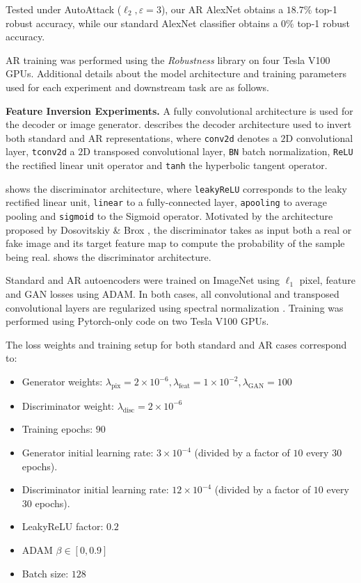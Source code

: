     Tested under AutoAttack ($\ell_{2}, \varepsilon=3$), our AR AlexNet obtains a $18.7\%$ top-1 robust accuracy, while our standard AlexNet classifier obtains a $0\%$ top-1 robust accuracy.
    
    AR training was performed using the \textit{Robustness} library \cite{robustness} on four Tesla V100 GPUs. Additional details about the model architecture and training parameters used for each experiment and downstream task are as follows.
    
    \textbf{Feature Inversion Experiments.} A fully convolutional architecture is used for the decoder or image generator.  describes the decoder architecture used to invert both standard and AR representations, where \texttt{conv2d} denotes a $2$D convolutional layer, \texttt{tconv2d} a $2$D transposed convolutional layer, \texttt{BN} batch normalization, \texttt{ReLU} the rectified linear unit operator and \texttt{tanh} the hyperbolic tangent operator.
    
    
    
     shows the discriminator architecture, where \texttt{leakyReLU} corresponds to the leaky rectified linear unit, \texttt{linear} to a fully-connected layer, \texttt{apooling} to average pooling and \texttt{sigmoid} to the Sigmoid operator. Motivated by the architecture proposed by Dosovitskiy \& Brox \cite{dosovitskiy_2016_generating}, the discriminator takes as input both a real or fake image and its target  feature map to compute the probability of the sample being real.  shows the discriminator architecture.
    
    
    Standard and AR autoencoders were trained on ImageNet using $\ell_{1}$ pixel, feature and GAN losses using ADAM. In both cases, all convolutional and transposed convolutional layers are regularized using spectral normalization \cite{miyato_2018_spectral}. Training was performed using Pytorch-only code on two Tesla V100 GPUs.
    
    The loss weights and training setup for both standard and AR cases correspond to:
    \begin{itemize}
     \setlength\itemsep{0.1\baselineskip}
        \item Generator weights: $\lambda_{\text{pix}}=2\times 10^{-6}, \lambda_{\text{feat}}=1\times 10^{-2}, \lambda_{\text{GAN}}= 100$
        \item Discriminator weight: $\lambda_{\text{disc}}=2\times 10^{-6}$
        \item Training epochs: $90$
        \item Generator initial learning rate: $3\times 10^{-4}$ (divided by a factor of $10$ every $30$ epochs).
        \item Discriminator initial learning rate: $12\times 10^{-4}$ (divided by a factor of $10$ every $30$ epochs).
        \item LeakyReLU factor: $0.2$
        \item ADAM $\beta\in [0, 0.9]$
        \item Batch size: $128$
    \end{itemize}
    

